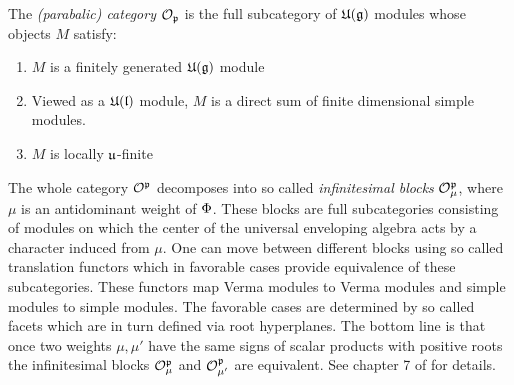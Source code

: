 The \emph{(parabalic) category $\mathcal{O}_{\mathfrak{p}}$} is the full subcategory of $\mathfrak{U(g)}$ modules whose objects $M$ satisfy:
\begin{enumerate}
\item $M$ is a finitely generated $\mathfrak{U(g)}$ module
\item Viewed as a $\mathfrak{U(l)}$ module, $M$ is a direct sum of finite dimensional simple modules.
\item $M$ is locally $\mathfrak{u}$-finite
\end{enumerate}

The whole category $\mathcal{O}^ {\mathfrak{p}}$ decomposes into so called \emph{infinitesimal blocks} $\mathcal{O}^{\mathfrak{p}}_\mu$, where $\mu$ is an antidominant weight of $\Phi$. These blocks are full subcategories consisting of modules on which the center of the universal enveloping algebra acts by a character induced from $\mu$.  One can move between different blocks using so called translation functors which in favorable cases provide equivalence of these subcategories. These functors map Verma modules to Verma modules and simple modules to simple modules. The favorable cases are determined by so called facets which are in turn defined via root hyperplanes. The bottom line is that once two weights $\mu, \mu'$ have the same signs of scalar products with positive roots the infinitesimal blocks $\mathcal{O}^{\mathfrak{p}}_\mu$ and $\mathcal{O}^{\mathfrak{p}}_{\mu'}$ are equivalent. See chapter 7 of \cite{humphreys_representations_2008} for details.

